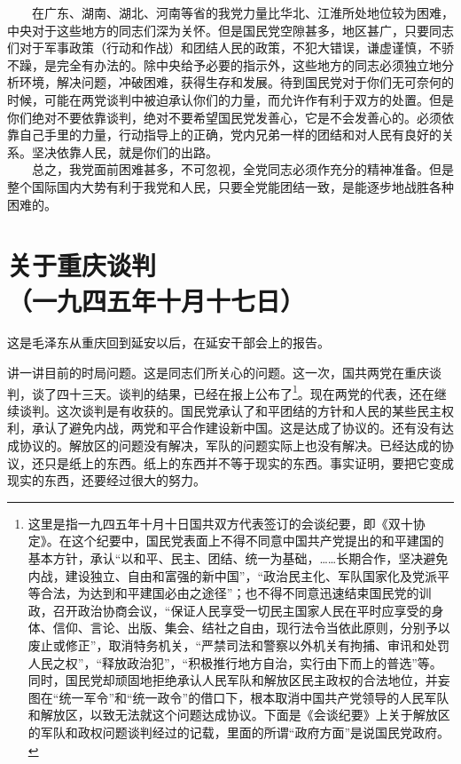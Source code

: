 \documentclass[cn,11pt,chinese]{elegantbook}
\def\myformat#1{\hfil\hfil #1}
\begin{document}
　　在广东、湖南、湖北、河南等省的我党力量比华北、江淮所处地位较为困难，中央对于这些地方的同志们深为关怀。但是国民党空隙甚多，地区甚广，只要同志们对于军事政策（行动和作战）和团结人民的政策，不犯大错误，谦虚谨慎，不骄不躁，是完全有办法的。除中央给予必要的指示外，这些地方的同志必须独立地分析环境，解决问题，冲破困难，获得生存和发展。待到国民党对于你们无可奈何的时候，可能在两党谈判中被迫承认你们的力量，而允许作有利于双方的处置。但是你们绝对不要依靠谈判，绝对不要希望国民党发善心，它是不会发善心的。必须依靠自己手里的力量，行动指导上的正确，党内兄弟一样的团结和对人民有良好的关系。坚决依靠人民，就是你们的出路。\\
　　总之，我党面前困难甚多，不可忽视，全党同志必须作充分的精神准备。但是整个国际国内大势有利于我党和人民，只要全党能团结一致，是能逐步地战胜各种困难的。\\
\newpage\section*{\myformat{关于重庆谈判}\\\myformat{（一九四五年十月十七日）}}
\begin{introduction}\item  这是毛泽东从重庆回到延安以后，在延安干部会上的报告。\end{introduction}
讲一讲目前的时局问题。这是同志们所关心的问题。这一次，国共两党在重庆谈判，谈了四十三天。谈判的结果，已经在报上公布了\footnote[1]{ 这里是指一九四五年十月十日国共双方代表签订的会谈纪要，即《双十协定》。在这个纪要中，国民党表面上不得不同意中国共产党提出的和平建国的基本方针，承认“以和平、民主、团结、统一为基础，……长期合作，坚决避免内战，建设独立、自由和富强的新中国”，“政治民主化、军队国家化及党派平等合法，为达到和平建国必由之途径”；也不得不同意迅速结束国民党的训政，召开政治协商会议，“保证人民享受一切民主国家人民在平时应享受的身体、信仰、言论、出版、集会、结社之自由，现行法令当依此原则，分别予以废止或修正”，取消特务机关，“严禁司法和警察以外机关有拘捕、审讯和处罚人民之权”，“释放政治犯”，“积极推行地方自治，实行由下而上的普选”等。同时，国民党却顽固地拒绝承认人民军队和解放区民主政权的合法地位，并妄图在“统一军令”和“统一政令”的借口下，根本取消中国共产党领导的人民军队和解放区，以致无法就这个问题达成协议。下面是《会谈纪要》上关于解放区的军队和政权问题谈判经过的记载，里面的所谓“政府方面”是说国民党政府。}。现在两党的代表，还在继续谈判。这次谈判是有收获的。国民党承认了和平团结的方针和人民的某些民主权利，承认了避免内战，两党和平合作建设新中国。这是达成了协议的。还有没有达成协议的。解放区的问题没有解决，军队的问题实际上也没有解决。已经达成的协议，还只是纸上的东西。纸上的东西并不等于现实的东西。事实证明，要把它变成现实的东西，还要经过很大的努力。\\
\end{document}
